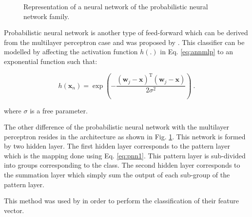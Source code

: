 \begin{enumerate}[leftmargin=*]
\begin{figure}
\caption{Representation of a neural network of the probabilistic neural network family.}
\label{fig:pnn}
\end{figure}

Probabilistic neural network is another type of feed-forward which can be derived from the multilayer perceptron case and was proposed by \cite{Specht1988}. This classifier can be modelled by affecting the activation function $h(.)$ in Eq. \ref{eq:annmlp} to an exponential function such that:

\begin{equation}
	h(\mathbf{x}_n) = \exp \left( - \frac{ (\mathbf{w}_j - \mathbf{x})^{\text{T}}(\mathbf{w}_j - \mathbf{x}) }{2\sigma^2} \right) \ .
	\label{eq:pnn1}
\end{equation}

\noindent where $\sigma$ is a free parameter.

The other difference of the probabilistic neural network with the multilayer perceptron resides in the architecture as shown in Fig. \ref{fig:pnn}. This network is formed by two hidden layer. The first hidden layer corresponds to the pattern layer which is the mapping done using Eq. \ref{eq:pnn1}. This pattern layer is sub-divided into groups corresponding to the class. The second hidden layer corresponds to the summation layer which simply sum the output of each sub-group of the pattern layer.

This method was used  by \cite{Ampeliotis2007,Ampeliotis2008,Viswanath2011} in order to perform the classification of their feature vector.


\end{enumerate}
